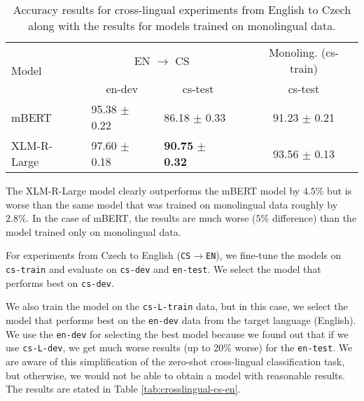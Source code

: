 \documentclass[10pt, a4paper]{article}
\begin{document}
\begin{table}[h!]
\begin{adjustbox}{width=1\linewidth,center}
\begin{tabular}{lllcc} \toprule
\multirow{2}{*}{Model}            & \multicolumn{2}{c}{EN $\rightarrow$ CS} & &  \multicolumn{1}{c}{ Monoling. (cs-train)}  \\ \cline{2-3} \cline{5-5} 
        & \multicolumn{1}{c}{en-dev}           & \multicolumn{1}{c}{cs-test} & & \multicolumn{1}{c}{cs-test}       \\ \midrule
mBERT & 95.38 $\pm$ 0.22     & 86.18 $\pm$ 0.33  &   & 91.23 $\pm$ 0.21 \\
XLM-R-Large & 97.60 $\pm$ 0.18     & \textbf{90.75} $\pm$ \textbf{0.32}   &  & 93.56 $\pm$ 0.13 \\ \bottomrule
\end{tabular}
\end{adjustbox}
\caption{Accuracy results for cross-lingual experiments from English to Czech along with the results for models trained on monolingual data.} \label{tab:crosslingual-en-cs}
\end{table}

\par The XLM-R-Large model clearly outperforms the mBERT model by $4.5\%$ but is worse than the same model that was trained on monolingual data roughly by $2.8\%$. In the case of mBERT, the results are much worse ($5\%$ difference) than the model trained only on monolingual data.


For experiments from Czech to English (\texttt{CS$\rightarrow$EN}), we fine-tune the models on \texttt{cs-train} and evaluate on \texttt{cs-dev} and \texttt{en-test}. We select the model that performs best on \texttt{cs-dev}.

\par We also train the model on the \texttt{cs-L-train} data, but in this case, we select the model that performs best on the \texttt{en-dev} data from the target language (English). We use the \texttt{en-dev} for selecting the best model because we found out that if we use \texttt{cs-L-dev}, we get much worse results (up to 20\% worse) for the \texttt{en-test}. We are aware of this simplification of the zero-shot cross-lingual classification task, but otherwise, we would not be able to obtain a model with reasonable results. The results are stated in Table \ref{tab:crosslingual-cs-en}.
\end{document}
